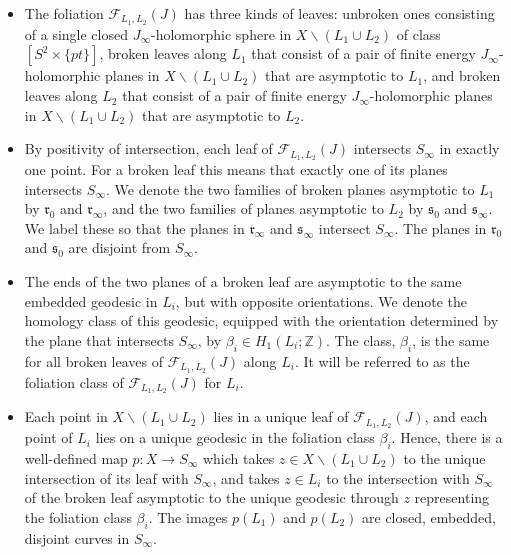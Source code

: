 \documentclass[12pt]{amsart}
\theoremstyle{definition}
\newcommand{\ZZ}{{\mathbb Z}}
\begin{document}
\begin{itemize}
\item[(F1)] The foliation $\mathcal{F}_{L_1,L_2}(J)$ has three kinds of leaves: unbroken ones consisting of a single closed $J_{\infty}$-holomorphic sphere in $X\smallsetminus (L_1 \cup L_2)$ of class $[S^2 \times \{pt\}]$, broken leaves along $L_1$ that consist of a pair of finite energy $J_{\infty}$-holomorphic planes in $X\smallsetminus (L_1 \cup L_2)$ that are asymptotic to $L_1$, and broken leaves along $L_2$ that consist of a pair of finite energy $J_{\infty}$-holomorphic planes in $X\smallsetminus (L_1 \cup L_2)$ that are asymptotic to $L_2$. 
  
\item[(F2)] By positivity of intersection, each leaf of $\mathcal{F}_{L_1,L_2}(J)$ intersects $S_{\infty}$ in exactly one point. For a broken leaf this means that exactly one of its planes intersects $S_{\infty}$. We denote the two families of broken planes asymptotic to $L_1$ by $\mathfrak{r}_0$ and $\mathfrak{r}_{\infty}$, and the two families of planes asymptotic to $L_2$ by  $\mathfrak{s}_0$ and $\mathfrak{s}_{\infty}$. We label these so that the planes in $\mathfrak{r}_{\infty}$ and $\mathfrak{s}_{\infty}$ intersect $S_{\infty}$. The planes in $\mathfrak{r}_0$ and $\mathfrak{s}_0$ are disjoint from $S_{\infty}$.
  
\item[(F3)] The ends of the two planes of a broken leaf are asymptotic to the same embedded geodesic in $L_i$, but with opposite orientations. We denote the homology class of this geodesic, equipped with the orientation determined by the plane that intersects $S_{\infty}$, by $\beta_i\in H_1(L_i; \ZZ)$. The class, $\beta_i$, is the same for all broken leaves of $\mathcal{F}_{L_1,L_2}(J)$ along $L_i$. It will be  referred to as the foliation class of $\mathcal{F}_{L_1,L_2}(J)$ for $L_i$.  
  

\item[(F4)] Each point in $X \smallsetminus (L_1 \cup L_2)$ lies in a unique leaf of $\mathcal{F}_{L_1,L_2}(J)$, and each point of $L_i$ lies on a unique geodesic in the foliation class $\beta_i$. Hence, there is a well-defined map $p \colon X \to S_{\infty}$ which takes $z \in X \smallsetminus (L_1 \cup L_2)$ to the unique intersection of its leaf with $S_\infty$, and takes $z \in L_i$ to the intersection with $S_{\infty}$ of the broken leaf asymptotic to the unique geodesic through $z$ representing the foliation class $\beta_i$. %
The images $p(L_1)$ and $p(L_2)$ are closed, embedded, disjoint curves in $S_{\infty}$.

\end{itemize}
\end{document}
